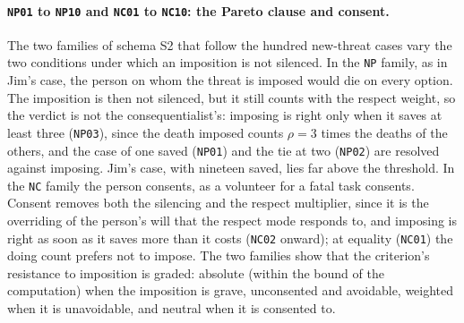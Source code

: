 \documentclass{situationist-preprint}
\begin{document}
\paragraph{\texttt{NP01} to \texttt{NP10} and \texttt{NC01} to \texttt{NC10}: the Pareto clause and consent.} The two families of schema S2 that follow the hundred new-threat cases vary the two conditions under which an imposition is not silenced. In the \texttt{NP} family, as in Jim's case, the person on whom the threat is imposed would die on every option. The imposition is then not silenced, but it still counts with the respect weight, so the verdict is not the consequentialist's: imposing is right only when it saves at least three (\texttt{NP03}), since the death imposed counts $\rho=3$ times the deaths of the others, and the case of one saved (\texttt{NP01}) and the tie at two (\texttt{NP02}) are resolved against imposing. Jim's case, with nineteen saved, lies far above the threshold. In the \texttt{NC} family the person consents, as a volunteer for a fatal task consents. Consent removes both the silencing and the respect multiplier, since it is the overriding of the person's will that the respect mode responds to, and imposing is right as soon as it saves more than it costs (\texttt{NC02} onward); at equality (\texttt{NC01}) the doing count prefers not to impose. The two families show that the criterion's resistance to imposition is graded: absolute (within the bound of the computation) when the imposition is grave, unconsented and avoidable, weighted when it is unavoidable, and neutral when it is consented to.
\end{document}
